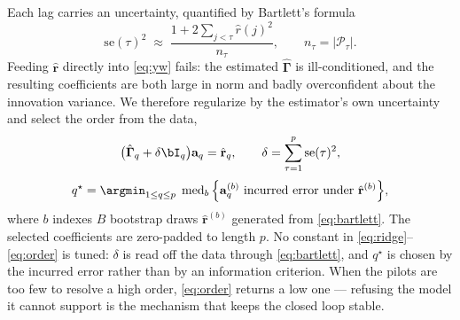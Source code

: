 Each lag carries an uncertainty, quantified by Bartlett's formula
\begin{equation}
  \mathrm{se}(\tau)^2 \;\approx\;
  \frac{1+2\sum_{j<\tau}\hat{r}(j)^2}{n_\tau},
  \qquad n_\tau=|\mathcal{P}_\tau| .
  \label{eq:bartlett}
\end{equation}
Feeding $\hat{\mathbf{r}}$ directly into \eqref{eq:yw} fails: the estimated
$\hat{\boldsymbol{\Gamma}}$ is ill-conditioned, and the resulting coefficients
are both large in norm and badly overconfident about the innovation variance.
We therefore regularize by the estimator's own uncertainty and select the order
from the data,
\begin{equation}
  \big(\hat{\boldsymbol{\Gamma}}_q+\delta\bI_q\big)\mathbf{a}_q=\hat{\mathbf{r}}_q,
  \qquad
  \delta=\sum_{\tau=1}^{p}\mathrm{se}(\tau)^2,
  \label{eq:ridge}
\end{equation}
\begin{equation}
  q^{\star} = \argmin_{1\le q\le p}\;
  \operatorname{med}_{b}\Big\{
    \mathbf{a}_q^{(b)}\ \text{incurred error under}\ \hat{\mathbf{r}}^{(b)}
  \Big\},
  \label{eq:order}
\end{equation}
where $b$ indexes $B$ bootstrap draws $\hat{\mathbf{r}}^{(b)}$ generated from
\eqref{eq:bartlett}. The selected coefficients are zero-padded to length $p$.
No constant in \eqref{eq:ridge}--\eqref{eq:order} is tuned: $\delta$ is read off
the data through \eqref{eq:bartlett}, and $q^\star$ is chosen by the incurred
error rather than by an information criterion. When the pilots are too few to
resolve a high order, \eqref{eq:order} returns a low one --- refusing the model
it cannot support is the mechanism that keeps the closed loop stable.
